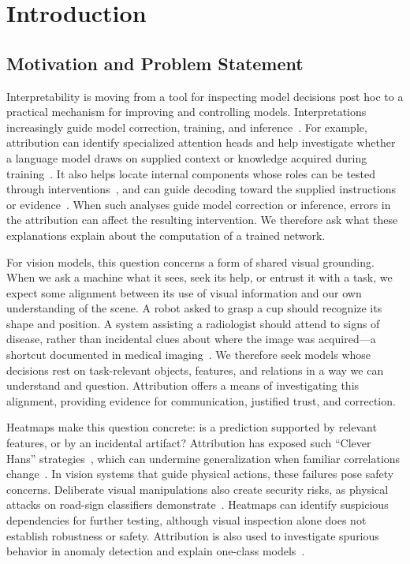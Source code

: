 \chapter{Introduction}\label{ch:introduction}

\section{Motivation and Problem Statement}\label{sec:motivation}

Interpretability is moving from a tool for inspecting model decisions post hoc to a practical mechanism for improving and controlling models. Interpretations increasingly guide model correction, training, and inference~\parencite{Anders2020ClArC,Pahde2023R2R,Ross2017RightReasons,Komorowski2026AGD}.
For example, attribution can identify specialized attention heads and help investigate whether a language model draws on supplied context or knowledge acquired during training~\parencite{Kahardipraja2025Atlas,Voita2019}. It also helps locate internal components whose roles can be tested through interventions~\parencite{Syed2024AttributionPatching,Kramar2024AtPStar,Hanna2024Faithfulness}, and can guide decoding toward the supplied instructions or evidence~\parencite{Komorowski2026AGD}. When such analyses guide model correction or inference, errors in the attribution can affect the resulting intervention. We therefore ask what these explanations explain about the computation of a trained network.

For vision models, this question concerns a form of shared visual grounding. When we ask a machine what it sees, seek its help, or entrust it with a task, we expect some alignment between its use of visual information and our own understanding of the scene. A robot asked to grasp a cup should recognize its shape and position. A system assisting a radiologist should attend to signs of disease, rather than incidental clues about where the image was acquired---a shortcut documented in medical imaging~\parencite{Zech2018Pneumonia}. We therefore seek models whose decisions rest on task-relevant objects, features, and relations in a way we can understand and question. Attribution offers a means of investigating this alignment, providing evidence for communication, justified trust, and correction.

Heatmaps make this question concrete: is a prediction supported by relevant features, or by an incidental artifact? Attribution has exposed such ``Clever Hans'' strategies~\parencite{Lapuschkin2019}, which can undermine generalization when familiar correlations change~\parencite{Geirhos2020Shortcut}. In vision systems that guide physical actions, these failures pose safety concerns. Deliberate visual manipulations also create security risks, as physical attacks on road-sign classifiers demonstrate~\parencite{Eykholt2018Physical}. Heatmaps can identify suspicious dependencies for further testing, although visual inspection alone does not establish robustness or safety. Attribution is also used to investigate spurious behavior in anomaly detection and explain one-class models~\parencite{Kauffmann2020CleverHans,Kauffmann2018OneClassDTD}.

